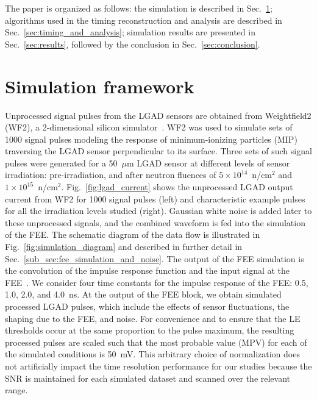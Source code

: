 \documentclass[preprint,1p]{elsarticle}
\begin{document}
The paper is organized as follows: the simulation is described in
Sec.~\ref{sec:simulation}; algorithms used in the timing
reconstruction and analysis are described in Sec.~\ref{sec:timing_and_analysis}; simulation results
are presented in Sec.~\ref{sec:results}, followed by the conclusion in
Sec.~\ref{sec:conclusion}.

\section{Simulation framework}
\label{sec:simulation}

Unprocessed signal pulses from the LGAD sensors are obtained from Weightfield2
(WF2), a 2-dimensional silicon simulator~\cite{Sadrozinski:2017qpv}. WF2 was
used to simulate sets of 1000 signal pulses modeling the response of
minimum-ionizing particles (MIP) traversing the LGAD sensor perpendicular to its surface.
Three sets of such signal pulses were generated for a 50~$\mu$m LGAD sensor at different levels of sensor
irradiation: pre-irradiation, and after neutron fluences of $5\times
10^{14}$~n/cm$^2$ and $1\times 10^{15}$~n/cm$^2$. Fig.~\ref{fig:lgad_current} shows the
unprocessed LGAD output current from WF2 for 1000 signal pulses (left)
and characteristic example pulses for all the irradiation levels studied (right).
Gaussian white noise is added later
to these unprocessed signals, and the combined waveform is fed into the
simulation of the FEE. The schematic diagram of the data flow is illustrated
in Fig.~\ref{fig:simulation_diagram} and described in further detail in
Sec.~\ref{sub_sec:fee_simulation_and_noise}. The output of the FEE simulation is
the convolution of the impulse response function and the input signal at the
FEE~\cite{Sansen}. We consider four time constants for the impulse response of the FEE:
0.5, 1.0, 2.0, and 4.0~\si{ns}. At the output of the FEE block, we obtain
simulated processed LGAD pulses, which include the effects of sensor
fluctuations, the shaping due to the FEE, and noise. For convenience
and to ensure that the LE thresholds occur at the same proportion to the pulse maximum,
the resulting processed pulses are scaled such that the most probable value (MPV) for each of the
simulated conditions is 50~\si{mV}. This arbitrary choice of normalization does not artificially
impact the time resolution performance for our studies because the SNR is maintained
for each simulated dataset and scanned over the relevant range.
\end{document}
